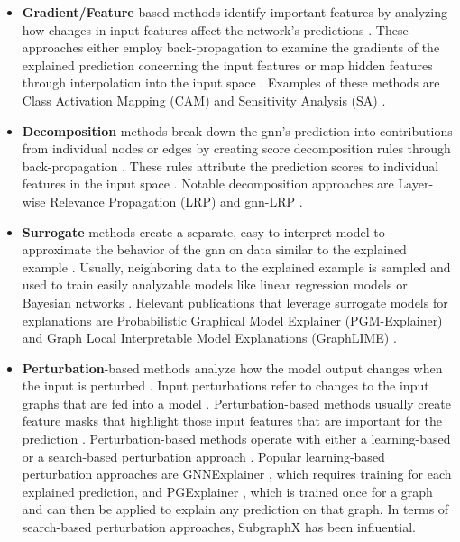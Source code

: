 \begin{itemize}
    \item \textbf{Gradient/Feature} based methods identify important features by analyzing how changes in input features affect the network's predictions \cite{yuan_explainability_2020}. These approaches either employ back-propagation to examine the gradients of the explained prediction concerning the input features or map hidden features through interpolation into the input space \cite{yuan_explainability_2020}. Examples of these methods are Class Activation Mapping (CAM)\cite{pope_explainability_2019} and Sensitivity Analysis (SA) \cite{baldassarre_explainability_2019}.
    \item \textbf{Decomposition} methods break down the \gls{gnn}'s prediction into contributions from individual nodes or edges by creating score decomposition rules through back-propagation \cite{yuan_explainability_2020}. These rules attribute the prediction scores to individual features in the input space \cite{yuan_explainability_2020, baldassarre_explainability_2019}. Notable decomposition approaches are Layer-wise Relevance Propagation (LRP) \cite{baldassarre_explainability_2019} and \gls{gnn}-LRP \cite{schnake_higher-order_2022}.
    \item \textbf{Surrogate} methods create a separate, easy-to-interpret model to approximate the behavior of the \gls{gnn} on data similar to the explained example \cite{yuan_explainability_2020}. Usually, neighboring data to the explained example is sampled and used to train easily analyzable models \cite{huang_graphlime_2023} like linear regression models \cite{duval_graphsvx_2021} or Bayesian networks \cite{vu_pgm-explainer_2020}. Relevant publications that leverage surrogate models for explanations are Probabilistic Graphical Model Explainer (PGM-Explainer) \cite{vu_pgm-explainer_2020} and Graph Local Interpretable Model Explanations (GraphLIME) \cite{huang_graphlime_2023}.
    \item \textbf{Perturbation}-based methods analyze how the model output changes when the input is perturbed \cite{yuan_explainability_2020}. Input perturbations refer to changes to the input graphs that are fed into a model \cite{yuan_explainability_2020}. Perturbation-based methods usually create feature masks that highlight those input features that are important for the prediction \cite{yuan_explainability_2020, ivanovs_perturbation-based_2021}. Perturbation-based methods operate with either a learning-based or a search-based perturbation approach \cite{xia_explaining_2023}. Popular learning-based perturbation approaches are GNNExplainer \cite{ying_gnnexplainer_2019}, which requires training for each explained prediction, and PGExplainer \cite{luo_parameterized_2020}, which is trained once for a graph and can then be applied to explain any prediction on that graph. In terms of search-based perturbation approaches, SubgraphX \cite{yuan_explainability_2021} has been influential.
\end{itemize}

